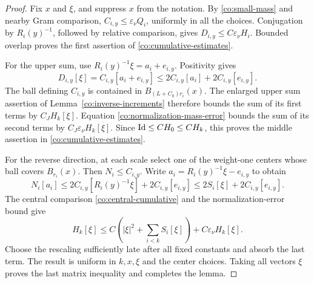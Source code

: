 \begin{proof}
Fix \(x\) and \(\xi\), and suppress \(x\) from the notation.
By \eqref{co:small-mass} and nearby Gram comparison,
\(C_{i,y}\le\varepsilon_\nu Q_i\), uniformly in all the choices.
Conjugation by \(R_i(y)^{-1}\), followed by relative comparison,
gives \(D_{i,y}\le C\varepsilon_\nu H_i\).  Bounded overlap
proves the first assertion of
\eqref{co:cumulative-estimates}.

For the upper sum, use
\(R_i(y)^{-1}\xi=a_i+e_{i,y}\).  Positivity gives
\[
 D_{i,y}[\xi]=C_{i,y}[a_i+e_{i,y}]
 \le2C_{i,y}[a_i]+2C_{i,y}[e_{i,y}].
\]
The ball defining \(C_{i,y}\) is contained in
\(B_{(L+C_0)r_i}(x)\).  The enlarged upper sum assertion of
Lemma~\ref{co:inverse-increments} therefore bounds the sum of
its first terms by \(C_J H_k[\xi]\).
Equation \eqref{co:normalization-mass-error} bounds the sum of
its second terms by \(C_J\varepsilon_\nu H_k[\xi]\).
Since \(\mathrm{Id}\le C H_0\le C H_k\), this proves the middle
assertion in \eqref{co:cumulative-estimates}.

For the reverse direction, at each scale select one of the
weight-one centers whose ball covers \(B_{r_i}(x)\).  Then
\(N_i\le C_{i,y}\).  Write
\(a_i=R_i(y)^{-1}\xi-e_{i,y}\) to obtain
\[
 N_i[a_i]\le2C_{i,y}[R_i(y)^{-1}\xi]
                +2C_{i,y}[e_{i,y}]
 \le2S_i[\xi]+2C_{i,y}[e_{i,y}].
\]
The central comparison \eqref{co:central-cumulative} and the
normalization-error bound give
\[
 H_k[\xi]\le C\left(|\xi|^2+\sum_{i<k}S_i[\xi]\right)
                      +C\varepsilon_\nu H_k[\xi].
\]
Choose the rescaling sufficiently late after all fixed constants
and absorb the last term.  The result is uniform in \(k,x,\xi\)
and the center choices.  Taking all vectors \(\xi\) proves the
last matrix inequality and completes the lemma.
\end{proof}
